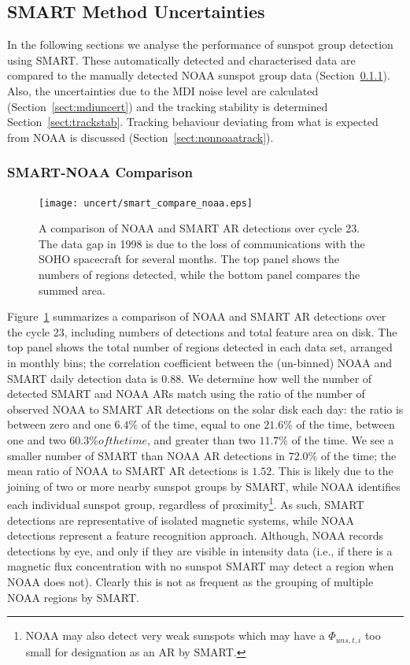 \subsection{SMART Method Uncertainties}\label{sect:smartmethuncert}

In the following sections we analyse the performance of sunspot group detection using \gls{SMART}. These automatically detected and characterised data are compared to the manually detected \gls{NOAA} sunspot group data (Section~\ref{sect:noaacomp}). Also, the uncertainties due to the \gls{MDI} noise level are calculated (Section~\ref{sect:mdiuncert}) and the tracking stability is determined Section~\ref{sect:trackstab}. Tracking behaviour deviating from what is expected from \gls{NOAA} is discussed (Section~\ref{sect:nonnoaatrack}).

\subsubsection{SMART-NOAA Comparison}\label{sect:noaacomp}

\begin{figure}[!t]
\centerline{\texttt{[image: uncert/smart\_compare\_noaa.eps]}}
\caption[NOAA and SMART detections over cycle 23.]{A comparison of NOAA and SMART AR detections over cycle 23. The data gap in 1998 is due to the loss of communications with the SOHO spacecraft for several months. The top panel shows the numbers of regions detected, while the bottom panel compares the summed area.}
\label{noaa_comp}
\end{figure}

Figure~\ref{noaa_comp} summarizes a comparison of \gls{NOAA} and \gls{SMART} \gls{AR} detections over the cycle 23, including numbers of detections and total feature area on disk. The top panel shows the total number of regions detected in each data set, arranged in monthly bins; the correlation coefficient between the (un-binned) NOAA and SMART daily detection data is $0.88$. We determine how well the number of detected SMART and NOAA ARs match using the ratio of the number of observed \gls{NOAA} to \gls{SMART} \gls{AR} detections on the solar disk each day: the ratio is between zero and one $6.4\%$ of the time, equal to one $21.6\%$ of the time, between one and two $60.3\% of the time$, and greater than two $11.7\%$ of the time. We see a smaller number of \gls{SMART} than \gls{NOAA} \gls{AR} detections in $72.0\%$ of the time; the mean ratio of \gls{NOAA} to \gls{SMART} \gls{AR} detections is $1.52$. This is likely due to the joining of two or more nearby sunspot groups by \gls{SMART}, while \gls{NOAA} identifies each individual sunspot group, regardless of proximity\footnote{NOAA may also detect very weak sunspots which may have a $\Phi_{uns,t,i}$ too small for designation as an \gls{AR} by \gls{SMART}.}. As such, \gls{SMART} detections are representative of isolated magnetic systems, while \gls{NOAA} detections represent a feature recognition approach. Although, \gls{NOAA} records detections by eye, and only if they are visible in intensity data (i.e., if there is a magnetic flux concentration with no sunspot \gls{SMART} may detect a region when \gls{NOAA} does not).  Clearly this is not as frequent as the grouping of multiple NOAA regions by SMART.

